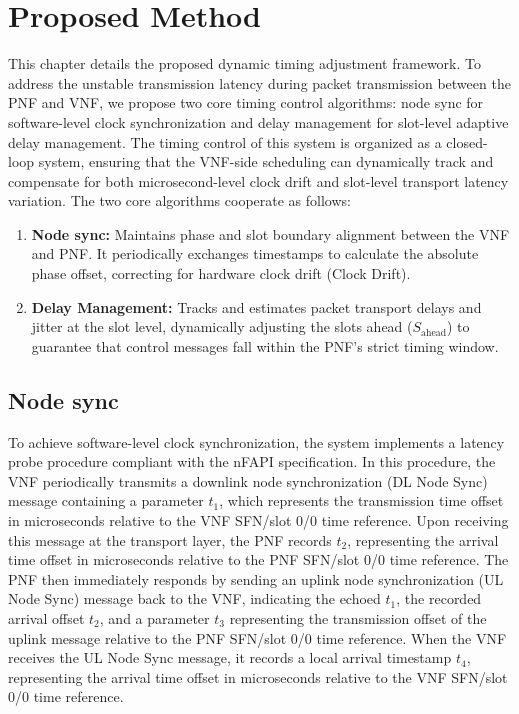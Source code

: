 \documentclass[../my_ntust_thesis.tex]{subfiles}
\begin{document}

\chapter{Proposed Method}
\label{sec:method}

This chapter details the proposed dynamic timing adjustment framework. To address the unstable transmission latency during packet transmission between the PNF and VNF, we propose two core timing control algorithms: node sync for software-level clock synchronization and delay management for slot-level adaptive delay management. The timing control of this system is organized as a closed-loop system, ensuring that the VNF-side scheduling can dynamically track and compensate for both microsecond-level clock drift and slot-level transport latency variation. The two core algorithms cooperate as follows:

\begin{enumerate}
    \item \textbf{Node sync:} Maintains phase and slot boundary alignment between the VNF and PNF. It periodically exchanges timestamps to calculate the absolute phase offset, correcting for hardware clock drift (Clock Drift).
    \item \textbf{Delay Management:} Tracks and estimates packet transport delays and jitter at the slot level, dynamically adjusting the slots ahead ($S_{\mathrm{ahead}}$) to guarantee that control messages fall within the PNF's strict timing window.
\end{enumerate}

\section{Node sync}
\label{subsec:node_sync}
To achieve software-level clock synchronization, the system implements a latency probe procedure compliant with the nFAPI specification. In this procedure, the VNF periodically transmits a downlink node synchronization (DL Node Sync) message containing a parameter $t_1$, which represents the transmission time offset in microseconds relative to the VNF SFN/slot 0/0 time reference. Upon receiving this message at the transport layer, the PNF records $t_2$, representing the arrival time offset in microseconds relative to the PNF SFN/slot 0/0 time reference. The PNF then immediately responds by sending an uplink node synchronization (UL Node Sync) message back to the VNF, indicating the echoed $t_1$, the recorded arrival offset $t_2$, and a parameter $t_3$ representing the transmission offset of the uplink message relative to the PNF SFN/slot 0/0 time reference. When the VNF receives the UL Node Sync message, it records a local arrival timestamp $t_4$, representing the arrival time offset in microseconds relative to the VNF SFN/slot 0/0 time reference.
\end{document}
